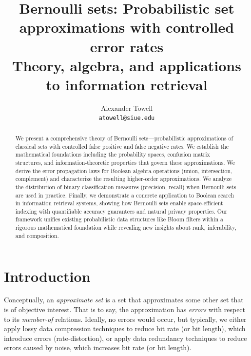 \documentclass[10pt,final,hidelinks]{article}
\title
{
    Bernoulli sets: Probabilistic set approximations with controlled error rates\\
    \large Theory, algebra, and applications to information retrieval
}
\author
{
    Alexander Towell\\
    \texttt{atowell@siue.edu}
}
\date{}
\numberwithin{equation}{section}
\newcommand{\tprate}{\tau}
\newcommand{\fprate}{\varepsilon}
\newcommand{\fnrate}{\omega}
\theoremstyle{plain}
\begin{document}
\maketitle
\begin{abstract}
We present a comprehensive theory of Bernoulli sets---probabilistic approximations of classical sets with controlled false positive and false negative rates.
We establish the mathematical foundations including the probability spaces, confusion matrix structures, and information-theoretic properties that govern these approximations.
We derive the error propagation laws for Boolean algebra operations (union, intersection, complement) and characterize the resulting higher-order approximations.
We analyze the distribution of binary classification measures (precision, recall) when Bernoulli sets are used in practice.
Finally, we demonstrate a concrete application to Boolean search in information retrieval systems, showing how Bernoulli sets enable space-efficient indexing with quantifiable accuracy guarantees and natural privacy properties.
Our framework unifies existing probabilistic data structures like Bloom filters within a rigorous mathematical foundation while revealing new insights about rank, inferability, and composition.
\end{abstract}

\tableofcontents

%

\section{Introduction}



Conceptually, an \emph{approximate set} is a set that approximates some other set that is of objective interest.
That is to say, the approximation has \emph{errors} with respect to its \emph{member-of} relations.
Ideally, no errors would occur, but typically, we either apply lossy data compression techniques to reduce bit rate (or bit length), which introduce errors (rate-distortion), or apply data redundancy techniques to reduce errors caused by noise, which increases bit rate (or bit length).
\end{document}
